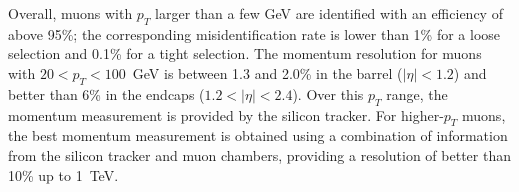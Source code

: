 Overall, muons with $p_T$ larger than a few GeV are identified with an efficiency of above 95\%; the corresponding misidentification rate is lower than 1\% for a loose selection and 0.1\% for a tight selection. The momentum resolution for muons with $20<p_T<100$~GeV is between 1.3 and 2.0\% in the barrel ($|\eta|<1.2$) and better than 6\% in the endcaps ($1.2<|\eta|<2.4$). Over this $p_T$ range, the momentum measurement is provided by the silicon tracker. For higher-$p_T$ muons, the best momentum measurement is obtained using a combination of information from the silicon tracker and muon chambers, providing a resolution of better than 10\% up to 1~TeV.




